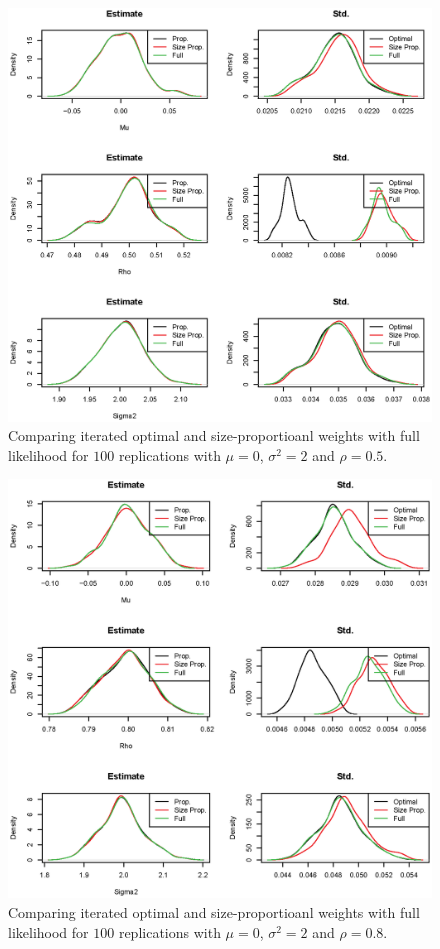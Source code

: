 \documentclass[11pt,a5paper,twoside]{book}
\begin{document}
{\begin{figure}[ht!]
\centering
\includegraphics[width=\textwidth]{rho2_opt.eps}
\caption{Comparing iterated optimal and size-proportioanl weights with full likelihood for $100$ replications with $\mu=0$, $\sigma^2=2$ and $\rho=0.5$.} \label{fig_rho2_opt}
\end{figure}

\begin{figure}[ht!]
\centering
\includegraphics[width=\textwidth]{rho3_opt.eps}
\caption{Comparing iterated optimal and size-proportioanl weights with full likelihood for $100$ replications with $\mu=0$, $\sigma^2=2$ and $\rho=0.8$.} \label{fig_rho3_opt}
\end{figure}


}
\end{document}
